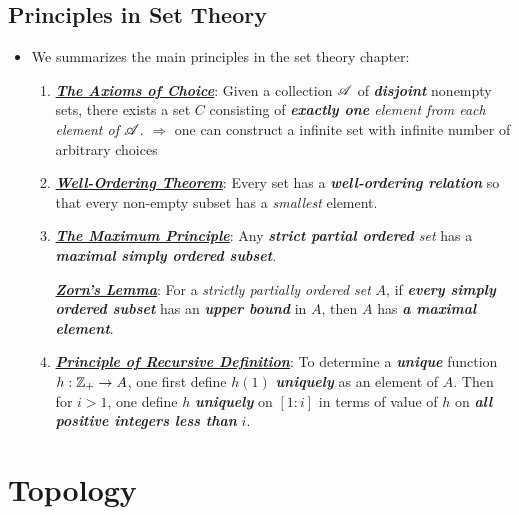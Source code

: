 \documentclass[11pt]{article}
\begin{document}
\subsection{Principles in Set Theory}
\begin{itemize}
\item \begin{remark}
We summarizes the main principles in the set theory chapter:
\begin{enumerate}
\item \underline{\emph{\textbf{The Axioms of Choice}}}: Given a collection ${\mathscr A}$ of \emph{\textbf{disjoint}} nonempty sets, there exists a set $C$ consisting of \emph{\textbf{exactly one} element from each element of ${\mathscr A}$}. $\Rightarrow$ one can construct a infinite set with infinite number of arbitrary choices

\item \underline{\emph{\textbf{Well-Ordering Theorem}}}: Every set has a \emph{\textbf{well-ordering relation}} so that every non-empty subset has a \emph{smallest} element.

\item  \underline{\emph{\textbf{The Maximum Principle}}}: Any \emph{\textbf{strict partial ordered} set} has a \emph{\textbf{maximal simply ordered subset}}.

 \underline{\emph{\textbf{Zorn's Lemma}}}: For a \emph{strictly partially ordered set} $A$, if \emph{\textbf{every simply ordered subset}} has an \emph{\textbf{upper bound}} in $A$, then $A$ has \emph{\textbf{a maximal element}}. 
 
 \item  \underline{\emph{\textbf{Principle of Recursive Definition}}}: To determine a \emph{\textbf{unique}} function $h: {\mathbb Z}_{+} \rightarrow A$, one first define $h(1)$ \emph{\textbf{uniquely}} as an element of $A$. Then for $i > 1$, one define $h$ \emph{\textbf{uniquely}} on $[1: i]$ in terms of value of $h$ on \emph{\textbf{all positive integers less than}} $i$.
\end{enumerate}
\end{remark}
\end{itemize}

\section{Topology}
\end{document}
